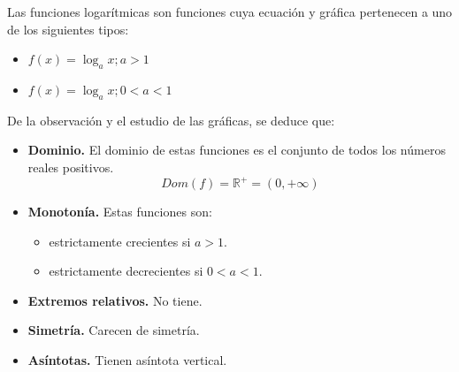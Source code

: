 Las funciones logarítmicas son funciones cuya ecuación y gráfica pertenecen a uno de los siguientes tipos:
\begin{itemize}
	\item $f(x) = \log_{a}x; a>1$
	\item $f(x) = \log_{a}x; 0<a<1$
\end{itemize}
De la observación y el estudio de las gráficas, se deduce que:
\begin{itemize}
	\item \textbf{Dominio.} El dominio de estas funciones es el conjunto de todos los números reales positivos.
	$$Dom(f) = \mathbb{R}^{+} = (0, +\infty)$$
	\item \textbf{Monotonía.} Estas funciones son:
	\begin{itemize}
		\item estrictamente crecientes si $a>1$.
		\item estrictamente decrecientes si $0<a<1$.
	\end{itemize}
	\item \textbf{Extremos relativos.} No tiene.
	\item \textbf{Simetría.} Carecen de simetría.
	\item \textbf{Asíntotas.} Tienen asíntota vertical.
\end{itemize}
